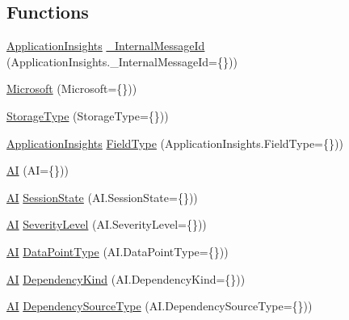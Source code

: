 \subsection*{Functions}
\begin{DoxyCompactItemize}
\item 
\hyperlink{_scripts_2ai_80_822_89-build00167_8js_aa415ef4f8cdd699689ef4b61db7656d8}{Application\+Insights} \hyperlink{obj_2_release_2_package_2_package_tmp_2_scripts_2ai_80_822_89-build00167_8js_a0825f4bc80a3a4696938ea70f7793f3b}{\+\_\+\+Internal\+Message\+Id} (Application\+Insights.\+\_\+\+Internal\+Message\+Id=\{\}))
\item 
\hyperlink{obj_2_release_2_package_2_package_tmp_2_scripts_2ai_80_822_89-build00167_8js_aa18e57a9e282b8cdff692e2819a82a4f}{Microsoft} (Microsoft=\{\}))
\item 
\hyperlink{obj_2_release_2_package_2_package_tmp_2_scripts_2ai_80_822_89-build00167_8js_ae12b8f4a2b3e8969d0c265448b72c222}{Storage\+Type} (Storage\+Type=\{\}))
\item 
\hyperlink{_scripts_2ai_80_822_89-build00167_8js_aa415ef4f8cdd699689ef4b61db7656d8}{Application\+Insights} \hyperlink{obj_2_release_2_package_2_package_tmp_2_scripts_2ai_80_822_89-build00167_8js_aad38300ec9ff4d9c31a92adaa89756c9}{Field\+Type} (Application\+Insights.\+Field\+Type=\{\}))
\item 
\hyperlink{obj_2_release_2_package_2_package_tmp_2_scripts_2ai_80_822_89-build00167_8js_a928268398fa5822b5b62bb9de35877dd}{AI} (AI=\{\}))
\item 
\hyperlink{_scripts_2ai_80_822_89-build00167_8js_a928268398fa5822b5b62bb9de35877dd}{AI} \hyperlink{obj_2_release_2_package_2_package_tmp_2_scripts_2ai_80_822_89-build00167_8js_a83607050b8e5441f90ecb58dbf77a543}{Session\+State} (A\+I.\+Session\+State=\{\}))
\item 
\hyperlink{_scripts_2ai_80_822_89-build00167_8js_a928268398fa5822b5b62bb9de35877dd}{AI} \hyperlink{obj_2_release_2_package_2_package_tmp_2_scripts_2ai_80_822_89-build00167_8js_a57d4bf254a5b6a23f371b3188e8b6de9}{Severity\+Level} (A\+I.\+Severity\+Level=\{\}))
\item 
\hyperlink{_scripts_2ai_80_822_89-build00167_8js_a928268398fa5822b5b62bb9de35877dd}{AI} \hyperlink{obj_2_release_2_package_2_package_tmp_2_scripts_2ai_80_822_89-build00167_8js_a0b0c021ead88e623cf692770b557c32d}{Data\+Point\+Type} (A\+I.\+Data\+Point\+Type=\{\}))
\item 
\hyperlink{_scripts_2ai_80_822_89-build00167_8js_a928268398fa5822b5b62bb9de35877dd}{AI} \hyperlink{obj_2_release_2_package_2_package_tmp_2_scripts_2ai_80_822_89-build00167_8js_a33df44d856645f38dc306e921cf8aff9}{Dependency\+Kind} (A\+I.\+Dependency\+Kind=\{\}))
\item 
\hyperlink{_scripts_2ai_80_822_89-build00167_8js_a928268398fa5822b5b62bb9de35877dd}{AI} \hyperlink{obj_2_release_2_package_2_package_tmp_2_scripts_2ai_80_822_89-build00167_8js_affcf2bfd934556ae1978f60fa1ddcf10}{Dependency\+Source\+Type} (A\+I.\+Dependency\+Source\+Type=\{\}))
\end{DoxyCompactItemize}
